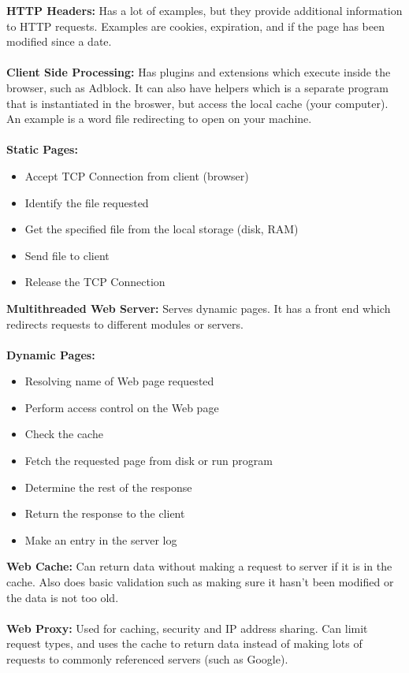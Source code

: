 \documentclass[a4paper,10pt]{article}
\begin{document}
\textcolor{JungleGreen}{\textbf{HTTP Headers:}} Has a lot of examples, but they provide additional information to HTTP requests. Examples are cookies, expiration, and if the page has been modified since a date. \\\\
\textcolor{JungleGreen}{\textbf{Client Side Processing:}} Has plugins and extensions which execute inside the browser, such as Adblock. It can also have helpers which is a separate program that is instantiated in the broswer, but access the local cache (your computer). An example is a word file redirecting to open on your machine. \\\\
\textcolor{JungleGreen}{\textbf{Static Pages:}}
\begin{itemize}
	\item Accept TCP Connection from client (browser)
	\item Identify the file requested 
	\item Get the specified file from the local storage (disk, RAM)
	\item Send file to client 
	\item Release the TCP Connection
\end{itemize}
\textcolor{JungleGreen}{\textbf{Multithreaded Web Server:}} Serves dynamic pages. It has a front end which redirects requests to different modules or servers. \\\\
\textcolor{JungleGreen}{\textbf{Dynamic Pages:}}
\begin{itemize}
	\item Resolving name of Web page requested 
	\item Perform access control on the Web page 
	\item Check the cache 
	\item Fetch the requested page from disk or run program 
	\item Determine the rest of the response 
	\item Return the response to the client 
	\item Make an entry in the server log 
\end{itemize}
\textcolor{JungleGreen}{\textbf{Web Cache:}} Can return data without making a request to server if it is in the cache. Also does basic validation such as making sure it hasn't been modified or the data is not too old. \\\\
\textcolor{JungleGreen}{\textbf{Web Proxy:}} Used for caching, security and IP address sharing. Can limit request types, and uses the cache to return data instead of making lots of requests to commonly referenced servers (such as Google). \\\\
\end{document}
